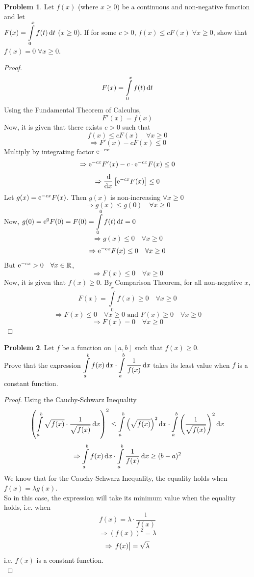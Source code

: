 \documentclass[14]{article}
\theoremstyle{definition}
\newtheorem{prob}{Problem}
\theoremstyle{case}
\begin{document}
\begin{prob}
Let $f(x)$ (where $x \geq 0$) be a continuous and non-negative function and let \\$F(x) = \displaystyle\int\limits_0^x f(t) \dif t$ ($x \geq 0$). If for some $c > 0$, $f(x) \leq c F(x)\; \forall x \geq 0$, show that $f(x) = 0 \; \forall x \geq 0$.
\begin{proof}
\[F(x) = \int\limits_0^x f(t) \dif t\]
Using the Fundamental Theorem of Calculus,
\[F'(x) = f(x)\]
Now, it is given that there exists $c > 0$ such that
\[f(x) \leq c F(x) \quad \forall x \geq 0\]
\[\Rightarrow F'(x) - cF(x) \leq 0\]
Multiply by integrating factor ${\rm e}^{-cx}$
\[\Rightarrow {\rm e}^{-cx} F'(x) - c\cdot{\rm e}^{-cx} F(x) \leq 0\]
\[\Rightarrow \dfrac{\dif}{\dif x} \left[ {\rm e}^{-cx} F(x) \right] \leq 0\]
Let $g(x) = {\rm e}^{-cx} F(x)$. Then $g(x)$ is non-increasing $\forall x \geq 0$
\[\Rightarrow g(x) \leq g(0) \quad \forall x \geq 0\]
Now, $g(0) = {\rm e}^0 F(0) = F(0) = \displaystyle\int\limits_0^0 f(t)\dif t = 0$
\[\Rightarrow g(x) \leq 0 \quad \forall x \geq 0 \]
\[\Rightarrow {\rm e}^{-cx} F(x) \leq 0 \quad \forall x \geq 0\]
But ${\rm e}^{-cx} > 0 \quad \forall x \in \mathbb{R}$,
\[\Rightarrow F(x) \leq 0 \quad \forall x \geq 0\]
Now, it is given that $f(x) \geq 0$. By Comparison Theorem, for all non-negative $x$,
\[F(x) = \int\limits_0^x f(x) \geq 0 \quad \forall x \geq 0\]
\[\Rightarrow F(x) \leq 0 \quad \forall x \geq 0 \text{ and } F(x) \geq 0 \quad \forall x \geq 0\]
\[\Rightarrow F(x) = 0 \quad \forall x \geq 0\]
\end{proof}
\end{prob}
\pagebreak
\begin{prob}
Let $f$ be a function on $[a, b]$ such that $f(x) \geq 0$.\\
Prove that the expression $\displaystyle\int\limits_a^b f(x) \dif x \cdot \int\limits_a^b \dfrac1{f(x)} \dif x$ takes its least value when $f$ is a constant function.
\begin{proof}
Using the Cauchy-Schwarz Inequality
\[\left( \int\limits_a^b \sqrt{f(x)} \cdot \dfrac1{\sqrt{f(x)}} \dif x \right)^2 \leq \int\limits_a^b \left(\sqrt{f(x)}\right)^2 \dif x \cdot \int\limits_a^b \left(\dfrac1{\sqrt{f(x)}} \right)^2 \dif x\]
\[\Rightarrow \int\limits_a^b f(x) \dif x \cdot \int\limits_a^b \dfrac1{f(x)} \dif x \geq (b-a)^2\]
We know that for the Cauchy-Schwarz Inequality, the equality holds when $f(x) = \lambda g(x)$.\\
So in this case, the expression will take its minimum value when the equality holds, i.e. when
\[f(x) = \lambda \cdot \dfrac1{f(x)}\]
\[\Rightarrow \left(f(x)\right)^2 = \lambda\]
\[\Rightarrow \abs{f(x)} = \sqrt{\lambda}\]
i.e. $f(x)$ is a constant function.\\
\end{proof}
\end{prob}
\pagebreak
\end{document}
